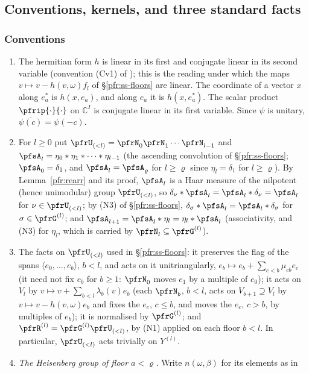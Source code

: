 \documentclass[10pt]{amsart}
\theoremstyle{definition}
\theoremstyle{remark}
\newcommand{\C}{\mathbb C}
\begin{document}
\subsection{Conventions, kernels, and three standard facts}\label{pfs:ss-conv}

\subsubsection*{Conventions}
\begin{enumerate}
\item[(i)] The hermitian form $h$ is linear in its first and conjugate linear in its second variable
(convention (Cv1) of {\cite[\S2.1]{P51}});
this is the reading under which the maps $v\mapsto v-h(v,\omega)f_l$ of \S\ref{pfr:ss-floors} are
linear. The coordinate of a vector $x$ along $e_a^*$ is $h(x,e_a)$, and along $e_a$ it is
$h(x,e_a^*)$. The scalar product $\pfrip{\cdot}{\cdot}$ on $\C^I$ is conjugate linear in its first
variable. Since $\psi$ is unitary, $\overline{\psi(c)}=\psi(-c)$.
\item[(ii)] For $l\ge0$ put $\pfrU_{(<l)}=\pfrN_0\pfrN_1\cdots\pfrN_{l-1}$ and
$\pfsA_l=\eta_0*\eta_1*\dots*\eta_{l-1}$ (the ascending convolution of \S\ref{pfr:ss-floors};
$\pfsA_0=\delta_1$, and $\pfsA_{l}=\pfsA_{\varrho}$ for $l\ge\varrho$ since $\eta_l=\delta_1$ for $l\ge\varrho$).
By Lemma~\ref{pfr:rearr} and its proof, $\pfsA_l$ is a Haar measure of the nilpotent (hence unimodular)
group $\pfrU_{(<l)}$, so $\delta_\nu*\pfsA_l=\pfsA_l*\delta_\nu=\pfsA_l$ for $\nu\in\pfrU_{(<l)}$; by (N3) of
\S\ref{pfr:ss-floors}, $\delta_\sigma*\pfsA_l=\pfsA_l*\delta_\sigma$ for $\sigma\in\pfrG^{(l)}$; and
$\pfsA_{l+1}=\pfsA_l*\eta_l=\eta_l*\pfsA_l$ (associativity, and (N3) for $\eta_l$, which is carried by
$\pfrN_l\subseteq\pfrG^{(l)}$).
\item[(iii)] The facts on $\pfrU_{(<l)}$ used in \S\ref{pfr:ss-floors}: it preserves the flag of the spans $\langle e_0,\dots,e_b\rangle$, $b<l$, and acts on it
unitriangularly, $e_b\mapsto e_b+\sum_{c<b}\mu_{cb}e_c$ (it need not fix $e_b$ for $b\ge1$: $\pfrN_0$ moves $e_1$ by a multiple of $e_0$); it acts on
$V_l$ by $v\mapsto v+\sum_{b<l}\lambda_b(v)e_b$ (each $\pfrN_b$, $b<l$, acts on $V_{b+1}\supseteq V_l$ by
$v\mapsto v-h(v,\omega)e_b$ and fixes the $e_c$, $c\le b$, and moves the $e_c$, $c>b$, by multiples of $e_b$);
it is normalised by $\pfrG^{(l)}$; and $\pfrR^{(l)}=\pfrG^{(l)}\pfrU_{(<l)}$, by (N1) applied on each floor
$b<l$. In particular, $\pfrU_{(<l)}$ acts trivially on $Y^{(l)}$.
\item[(iv)] \emph{The Heisenberg group of floor $a<\varrho$.} Write $n(\omega,\beta)$ for its elements as in

\end{enumerate}
\end{document}
